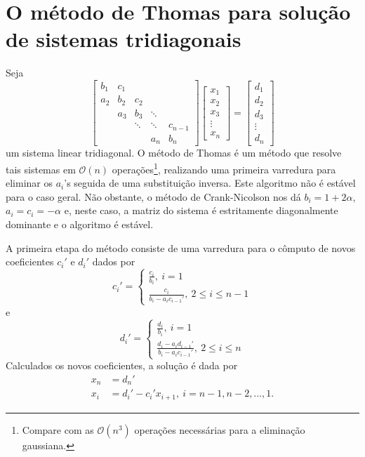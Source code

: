 \documentclass[twocolumn,showpacs,%
  nofootinbib,aps,superscriptaddress,%
  eqsecnum,prd,notitlepage,showkeys,10pt]{revtex4-1} %
\renewcommand{\leq}{\leqslant}
\begin{document}
\appendix

%
\section{O método de Thomas para solução de sistemas tridiagonais}
%
	Seja
	\begin{equation}
		\begin{bmatrix}
			b_1 & c_1 &     &        &  \\
			a_2 & b_2 & c_2 &        &  \\
			    & a_3 & b_3 & \ddots &  \\
			    &     & \ddots & \ddots & c_{n-1} \\
			    &     &  & a_n & b_n 
		\end{bmatrix}\begin{bmatrix}
			x_1 \\
			x_2 \\
			x_3 \\
			\vdots \\
			x_n
		\end{bmatrix} = \begin{bmatrix}
			d_1 \\
			d_2 \\
			d_3 \\
			\vdots \\
			d_n
		\end{bmatrix}
	\end{equation}
	um sistema linear tridiagonal. O método de Thomas é um método que resolve tais sistemas em $\mathcal{O}(n)$
	operações\footnote{Compare com as $\mathcal{O}(n^3)$ operações necessárias para a eliminação gaussiana.},
	realizando uma primeira varredura para eliminar os $a_i$'s seguida de uma substituição inversa.
	Este algoritmo não é estável para o caso geral. Não obstante, o método de Crank-Nicolson nos dá $b_i = 1 + 2\alpha$,
	$a_i = c_i = -\alpha$ e, neste caso, a matriz do sistema é estritamente diagonalmente dominante e o algoritmo é estável.

	A primeira etapa do método consiste de uma varredura para o cômputo de novos coeficientes $c_i'$ e $d_i'$ dados por
	\begin{equation}
		c_i' = \begin{cases}
			\displaystyle{\frac{c_i}{b_i}}, \ i = 1 \\
			\displaystyle{\frac{c_i}{b_i - a_i c_{i-1}'}}, \ 2 \leq i \leq n-1
		\end{cases}
	\end{equation}
	e
	\begin{equation}
		d_i' = \begin{cases}
			\displaystyle{\frac{d_i}{b_i}}, \ i = 1 \\
			\displaystyle{\frac{d_i - a_i d_{i-1}'}{b_i - a_i c_{i-1}'}}, \ 2 \leq i \leq n
		\end{cases}
	\end{equation}
	Calculados os novos coeficientes, a solução é dada por
	\begin{align*}
		x_n &= d_n' \\
		x_i &= d_i' - c_i' x_{i+1}, \ i = n-1, n-2, \dots, 1.
	\end{align*}
\end{document}
